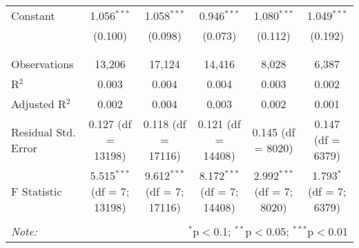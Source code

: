 \begin{table}[!htbp]
\begin{tabular}{@{\extracolsep{5pt}}lccccc}
 Constant & 1.056$^{***}$ & 1.058$^{***}$ & 0.946$^{***}$ & 1.080$^{***}$ & 1.049$^{***}$ \\ 
  & (0.100) & (0.098) & (0.073) & (0.112) & (0.192) \\ 
  & & & & & \\ 
\hline \\[-1.8ex] 
Observations & 13,206 & 17,124 & 14,416 & 8,028 & 6,387 \\ 
R$^{2}$ & 0.003 & 0.004 & 0.004 & 0.003 & 0.002 \\ 
Adjusted R$^{2}$ & 0.002 & 0.004 & 0.003 & 0.002 & 0.001 \\ 
Residual Std. Error & 0.127 (df = 13198) & 0.118 (df = 17116) & 0.121 (df = 14408) & 0.145 (df = 8020) & 0.147 (df = 6379) \\ 
F Statistic & 5.515$^{***}$ (df = 7; 13198) & 9.612$^{***}$ (df = 7; 17116) & 8.172$^{***}$ (df = 7; 14408) & 2.992$^{***}$ (df = 7; 8020) & 1.793$^{*}$ (df = 7; 6379) \\ 
\hline 
\hline \\[-1.8ex] 
\textit{Note:}  & \multicolumn{5}{r}{$^{*}$p$<$0.1; $^{**}$p$<$0.05; $^{***}$p$<$0.01} \\ 
\end{tabular} 
\end{table} 

